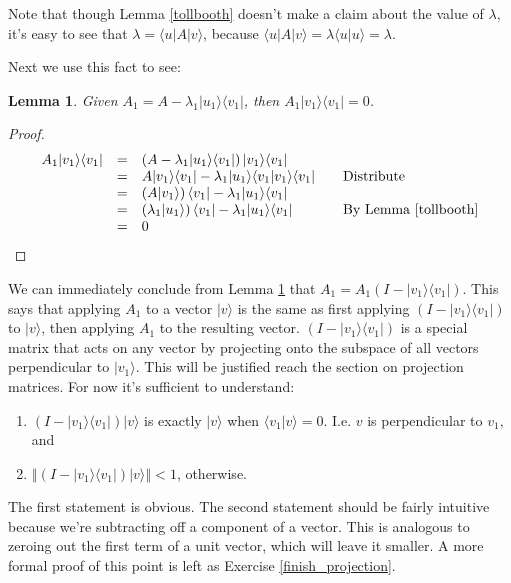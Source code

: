 \documentclass{amsbook}
\newtheorem{lemma}[theorem]{Lemma}
\begin{document}
Note that though Lemma \ref{tollbooth} doesn't make a claim about the value of $\lambda$, it's easy to see that $\lambda=\langle u |A| v\rangle$, because $\langle u|A|v\rangle = \lambda\langle u|u\rangle = \lambda$.

Next we use this fact to see:

\begin{lemma}
\label{a1lemma}
Given $A_1=A-\lambda_1| u _1\rangle\langle v _1|$, then $A_1| v _1\rangle\langle v _1|=0$.
\end{lemma}

\begin{proof}
$$
\begin{array}{rcll}
A_1| v _1\rangle\langle v _1| &=& \left(A-\lambda_1| u _1\rangle\langle v _1|\right)| v _1\rangle\langle v _1|& \\
&=& A| v _1\rangle\langle v _1| - \lambda_1| u _1\rangle\langle v _1| v _1\rangle\langle v _1| & \quad\text{Distribute}\\
&=& \left(A| v _1\rangle\right)\langle v _1| - \lambda_1| u _1\rangle\langle v _1|& \\
&=& \left(\lambda_1| u _1\rangle\right)\langle v _1| - \lambda_1| u _1\rangle\langle v _1|&\quad\text{By Lemma \ref{tollbooth}} \\
&=& 0
\end{array}
$$
\end{proof}

We can immediately conclude from Lemma \ref{a1lemma} that $A_1=A_1\left(I-| v _1\rangle\langle v _1|\right)$.  This says that applying $A_1$ to a vector $| v \rangle$ is the same as first applying $\left(I-| v _1\rangle\langle v _1|\right)$ to $| v \rangle$, then applying $A_1$ to the resulting vector.  $\left(I-| v _1\rangle\langle v _1|\right)$ is a special matrix that acts on any vector by projecting onto the subspace of all vectors perpendicular to $| v _1\rangle$.  This will be justified reach the section on projection matrices.  For now it's sufficient to understand:

\begin{enumerate}
\item  $\left(I-| v _1\rangle\langle v _1|\right)| v \rangle$ is exactly $| v \rangle$ when $\langle v _1| v \rangle=0$.  I.e. $ v $ is perpendicular to $ v _1$, and 
\item  $\left\Vert\left(I-| v _1\rangle\langle v _1|\right)| v \rangle\right\Vert < 1$, otherwise.
\end{enumerate}

The first statement is obvious.  The second statement should be fairly intuitive because we're subtracting off a component of a vector.  This is analogous to zeroing out the first term of a unit vector, which will leave it smaller.  A more formal proof of this point is left as Exercise \ref{finish_projection}.
\end{document}
